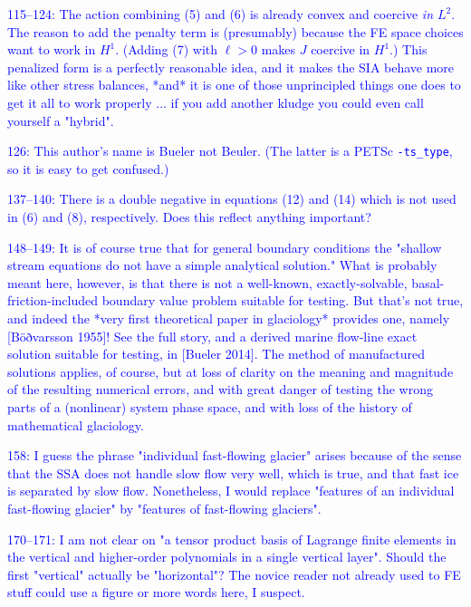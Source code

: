 \documentclass{article}
\theoremstyle{definition}
\theoremstyle{plain}
\begin{document}
\textcolor{blue}{115--124:  The action combining (5) and (6) is already convex and coercive \emph{in $L^2$}.  The reason to add the penalty term is (presumably) because the FE space choices want to work in $H^1$.  (Adding (7) with $\ell > 0$ makes $J$ coercive in $H^1$.)  This penalized form is a perfectly reasonable idea, and it makes the SIA behave more like other stress balances, *and* it is one of those unprincipled things one does to get it all to work properly ... if you add another kludge you could even call yourself a "hybrid".}

\textcolor{blue}{126:  This author's name is Bueler not Beuler.  (The latter is a PETSc \texttt{-ts\_type}, so it is easy to get confused.)}

\textcolor{blue}{137--140:  There is a double negative in equations (12) and (14) which is not used in (6) and (8), respectively.  Does this reflect anything important?}

\textcolor{blue}{148--149:  It is of course true that for general boundary conditions the "shallow stream equations do not have a simple analytical solution."  What is probably meant here, however, is that there is not a well-known, exactly-solvable, basal-friction-included boundary value problem suitable for testing.  But that's not true, and indeed the *very first theoretical paper in glaciology* provides one, namely [Böðvarsson 1955]!  See the full story, and a derived marine flow-line exact solution suitable for testing, in [Bueler 2014].  The method of manufactured solutions applies, of course, but at loss of clarity on the meaning and magnitude of the resulting numerical errors, and with great danger of testing the wrong parts of a (nonlinear) system phase space, and with loss of the history of mathematical glaciology.}

\textcolor{blue}{158:  I guess the phrase "individual fast-flowing glacier" arises because of the sense that the SSA does not handle slow flow very well, which is true, and that fast ice is separated by slow flow.  Nonetheless, I would replace "features of an individual fast-flowing glacier" by "features of fast-flowing glaciers".}

\textcolor{blue}{170--171:  I am not clear on "a tensor product basis of Lagrange finite elements in the vertical and higher-order polynomials in a single vertical layer".  Should the first "vertical" actually be "horizontal"?  The novice reader not already used to FE stuff could use a figure or more words here, I suspect.}
\end{document}
